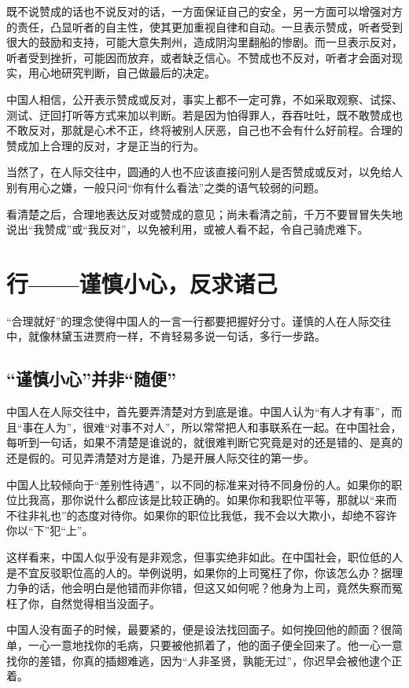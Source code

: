\documentclass[fontset=fandol, a4paper, 12pt, openright]{ctexbook}
\begin{document}
既不说赞成的话也不说反对的话，一方面保证自己的安全，另一方面可以增强对方的责任，凸显听者的自主性，使其更加重视自律和自动。一旦表示赞成，听者受到很大的鼓励和支持，可能大意失荆州，造成阴沟里翻船的惨剧。而一旦表示反对，听者受到挫折，可能因而放弃，或者缺乏信心。不赞成也不反对，听者才会面对现实，用心地研究判断，自己做最后的决定。

中国人相信，公开表示赞成或反对，事实上都不一定可靠，不如采取观察、试探、测试、迂回打听等方式来加以判断。若是因为怕得罪人，吞吞吐吐，既不敢赞成也不敢反对，那就是心术不正，终将被别人厌恶，自己也不会有什么好前程。合理的赞成加上合理的反对，才是正当的行为。

当然了，在人际交往中，圆通的人也不应该直接问别人是否赞成或反对，以免给人别有用心之嫌，一般只问“你有什么看法”之类的语气较弱的问题。

看清楚之后，合理地表达反对或赞成的意见；尚未看清之前，千万不要冒冒失失地说出“我赞成”或“我反对”，以免被利用，或被人看不起，令自己骑虎难下。


\chapter{行——谨慎小心，反求诸己}
“合理就好”的理念使得中国人的一言一行都要把握好分寸。谨慎的人在人际交往中，就像林黛玉进贾府一样，不肯轻易多说一句话，多行一步路。

\section{“谨慎小心”并非“随便”}

中国人在人际交往中，首先要弄清楚对方到底是谁。中国人认为“有人才有事”，而且“事在人为”，很难“对事不对人”，所以常常把人和事联系在一起。在中国社会，每听到一句话，如果不清楚是谁说的，就很难判断它究竟是对的还是错的、是真的还是假的。可见弄清楚对方是谁，乃是开展人际交往的第一步。

中国人比较倾向于“差别性待遇”，以不同的标准来对待不同身份的人。如果你的职位比我高，那你说什么都应该是比较正确的。如果你和我职位平等，那就以“来而不往非礼也”的态度对待你。如果你的职位比我低，我不会以大欺小，却绝不容许你以“下”犯“上”。

这样看来，中国人似乎没有是非观念，但事实绝非如此。在中国社会，职位低的人是不宜反驳职位高的人的。举例说明，如果你的上司冤枉了你，你该怎么办？据理力争的话，他会明白是他错而非你错，但这又如何呢？他身为上司，竟然失察而冤枉了你，自然觉得相当没面子。

中国人没有面子的时候，最要紧的，便是设法找回面子。如何挽回他的颜面？很简单，一心一意地找你的毛病，只要被他抓着了，他的面子便全回来了。他一心一意找你的差错，你真的插翅难逃，因为“人非圣贤，孰能无过”，你迟早会被他逮个正着。
\end{document}
